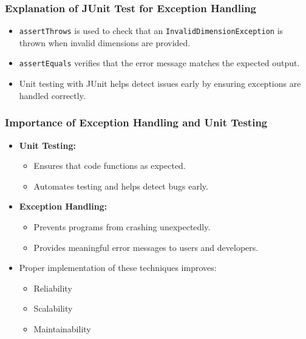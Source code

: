 \documentclass[aspectratio=169, table]{beamer}
\begin{document}
\begin{frame}[fragile]
	\frametitle{\LARGE{Explanation of JUnit Test for Exception Handling}}
	
	\begin{itemize}
		\item \texttt{assertThrows} is used to check that an \texttt{InvalidDimensionException} is thrown when invalid dimensions are provided.
		\item \texttt{assertEquals} verifies that the error message matches the expected output.
		\item Unit testing with JUnit helps detect issues early by ensuring exceptions are handled correctly.
	\end{itemize}
\end{frame}

\begin{frame}[fragile]
	\frametitle{\LARGE{Importance of Exception Handling and Unit Testing}}
	
	\begin{itemize}
		\item \textbf{Unit Testing:}
		\begin{itemize}
			\item Ensures that code functions as expected.
			\item Automates testing and helps detect bugs early.
		\end{itemize}
		\item \textbf{Exception Handling:}
		\begin{itemize}
			\item Prevents programs from crashing unexpectedly.
			\item Provides meaningful error messages to users and developers.
		\end{itemize}
		\item Proper implementation of these techniques improves:
		\begin{itemize}
			\item Reliability
			\item Scalability
			\item Maintainability
		\end{itemize}
	\end{itemize}
\end{frame}
\end{document}
